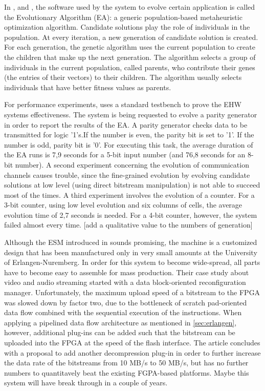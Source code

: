 
In \cite{virtex4}, \cite{dpr} and  \cite{erlangen}, the software used by the system to evolve certain application is called the Evolutionary Algorithm (EA): a generic population-based metaheuristic optimization algorithm. Candidate solutions play the role of individuals in the population. At every iteration, a new generation of candidate solution is created. For each generation, the genetic algorithm uses the current population to create the children that make up the next generation. The algorithm selects a group of individuals in the current population, called parents, who contribute their genes (the entries of their vectors) to their children. The algorithm usually selects individuals that have better fitness values as parents. 

For performance experiments, \cite{virtex4} uses a standard testbench to prove the EHW systems effectiveness. The system is being requested to evolve a parity generator in order to report the results of the EA. A parity generator checks data to be transmitted for logic '1's.If the number is even, the parity bit is set to '1'. If the number is odd, parity bit is '0'. For executing this task, the average duration of the EA runs is 7,9 seconds for a 5-bit input number (and 76,8 seconds for an 8-bit number). A second experiment concerning the evolution of communication channels causes trouble, since the fine-grained evolution by evolving candidate solutions at low level (using direct bitstream manipulation) is not able to succeed most of the times. A third experiment involves the evolution of a counter. For a 3-bit counter, using low level evolution and six columns of cells, the average evolution time of 2,7 seconds is needed. For a 4-bit counter, however, the system failed almost every time. [add a qualitative value to the numbers of generation]

Although the ESM introduced in \cite{erlangen} sounds promising, the machine is a customized design that has been manufactured only in very small amounts at the University of Erlangen-Nuremberg. In order for this system to become wide-spread, all parts have to become easy to assemble for mass production. Their case study about video and audio streaming started with a data block-oriented reconfiguration manager. Unfortunately, the maximum upload speed of a bitstream to the FPGA was slowed down by factor two, due to the bottleneck of scratch pad-oriented data flow combined with the sequential execution of the instructions. When applying a pipelined data flow architecture as mentioned in \ref{sec:erlangen}, however, additional plug-ins can be added such that the bitstream can be uploaded into the FPGA at the speed of the flash interface. The article concludes with a proposal to add another decompression plug-in in order to further increase the data rate of the bitstreams from 10 MB/s to 50 MB/s, but has no further numbers to quantitavely beat the existing FGPA-based platforms. Maybe this system will have break through in a couple of years.

